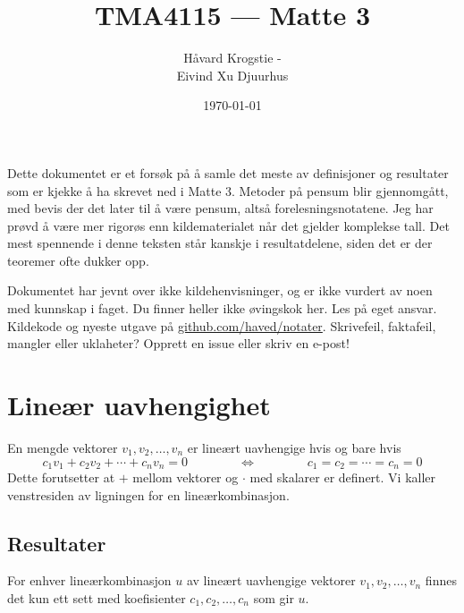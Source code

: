 \documentclass[12pt,a4paper,norsk]{article}
\title{TMA4115 --- Matte 3}
\author{Håvard Krogstie - \randomize{\lst{}.\fst{}@gmail.com} \\ Eivind Xu Djuurhus}
\date{\today}
\begin{document}
\maketitle

\noindent
Dette dokumentet er et forsøk på å samle det meste av definisjoner og resultater
som er kjekke å ha skrevet ned i Matte 3. Metoder på pensum blir gjennomgått,
med bevis der det later til å være pensum, altså forelesningsnotatene. Jeg har
prøvd å være mer rigorøs enn kildematerialet når det gjelder komplekse tall.
Det mest spennende i denne teksten står kanskje i resultatdelene, siden
det er der teoremer ofte dukker opp.

Dokumentet har jevnt over ikke kildehenvisninger, og er ikke vurdert av noen
med kunnskap i faget. Du finner heller ikke øvingskok her. Les på eget ansvar.
Kildekode og nyeste utgave på
\href{https://github.com/haved/notater/}{github.com/haved/notater}. Skrivefeil,
faktafeil, mangler eller uklaheter? Opprett en issue eller skriv en e-post!

\clearpage
\tableofcontents
\clearpage

\section{Lineær uavhengighet}
En mengde vektorer $v_{1}, v_{2}, \ldots, v_{n}$ er lineært uavhengige hvis og bare
hvis
\[c_{1}v_{1} + c_{2}v_{2} + \cdots + c_{n}v_{n} = 0 \hspace{4em} \Longleftrightarrow \hspace{4em} c_{1}=c_{2}=\cdots=c_{n}=0\]
Dette forutsetter at $+$ mellom vektorer og $\cdot$ med skalarer er definert. Vi
kaller venstresiden av ligningen for en lineærkombinasjon.

\subsection{Resultater}
For enhver lineærkombinasjon $u$ av lineært uavhengige vektorer
$v_{1}, v_{2}, \ldots, v_{n}$ finnes det kun ett sett med koefisienter
$c_{1}, c_{2}, \ldots, c_{n}$ som gir $u$.
\end{document}
